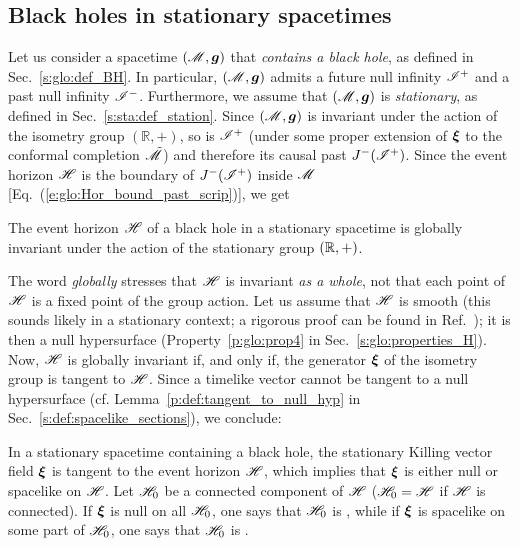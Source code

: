 \subsection{Black holes in stationary spacetimes}
\label{s:sta:BH_stationary}

Let us consider a spacetime $(\mathscr{M},\bm{g})$ that \emph{contains a black hole}, as defined in
Sec.~\ref{s:glo:def_BH}. In particular, $(\mathscr{M},\bm{g})$ admits a future null
infinity $\mathscr{I}^+$ and a past null infinity $\mathscr{I}^-$.
Furthermore, we assume that $(\mathscr{M},\bm{g})$ is \emph{stationary},
as defined in Sec.~\ref{s:sta:def_station}.
Since $(\mathscr{M},\bm{g})$ is invariant under the action of the isometry group $(\mathbb{R},+)$,
so is $\mathscr{I}^+$ (under some proper extension of $\bm{\xi}$ to the conformal
completion $\tilde{\mathscr{M}}$)
and therefore its causal past $J^-(\mathscr{I}^+)$. Since the event horizon $\mathscr{H}$
is the boundary of $J^-(\mathscr{I}^+)$
inside $\mathscr{M}$ [Eq.~(\ref{e:glo:Hor_bound_past_scrip})], we get

\begin{prop}
\label{p:sta:stationary_hor}
The event horizon $\mathscr{H}$ of a black hole in a stationary spacetime
is globally invariant under the action of the stationary group $(\mathbb{R},+)$.
\end{prop}

The word \emph{globally} stresses that
$\mathscr{H}$ is invariant \emph{as a whole}, not that
each point of $\mathscr{H}$ is a fixed point of the group action.
Let us assume that $\mathscr{H}$ is smooth (this sounds likely in a stationary context;
a rigorous proof can be found in Ref.~\cite{ChrusDGH01});
it is then a null hypersurface (Property~\ref{p:glo:prop4} in Sec.~\ref{s:glo:properties_H}).
Now, $\mathscr{H}$ is globally invariant if, and only if, the
generator $\bm{\xi}$ of the isometry group is tangent to $\mathscr{H}$.
Since a timelike vector cannot be tangent to a null hypersurface (cf.
Lemma~\ref{p:def:tangent_to_null_hyp} in Sec.~\ref{s:def:spacelike_sections}), we conclude:

\begin{prop}
\label{p:sta:xi_tangent_H}
In a stationary spacetime containing a black hole,
the stationary Killing vector field  $\bm{\xi}$ is tangent to the event horizon
$\mathscr{H}$, which implies that $\bm{\xi}$ is either null or spacelike on $\mathscr{H}$.
Let $\mathscr{H}_0$ be a connected component of $\mathscr{H}$
($\mathscr{H}_0 = \mathscr{H}$ if $\mathscr{H}$ is connected).
If $\bm{\xi}$ is null on all $\mathscr{H}_0$, one says that $\mathscr{H}_0$
is , while if $\bm{\xi}$ is
spacelike on some part of $\mathscr{H}_0$, one says that $\mathscr{H}_0$ is
.
\end{prop}

